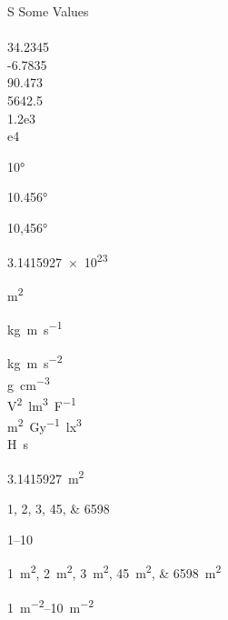 \documentclass[12pt,ngerman]{scrartcl}
\begin{document}
\begin{table}
\caption{Standardverhalten des  \texttt{S} Spaltentyps}
\centering
\begin{tabular}{S}
\toprule
{Some Values} \\
 \\
34.2345 \\
-6.7835 \\
90.473 \\
5642.5 \\
1.2e3 \\
e4 \\
\bottomrule
\end{tabular}
\end{table}

\ang{10}

\ang{10.456}

\ang{10,456}





\num{3.1415927e23}

\si{m^2}

\si{kg.m.s^{-1}}

\si{\kilo\gram\metre\per\square\second} \\
\si{\gram\per\cubic\centi\metre} \\
\si{\square\volt\cubic\lumen\per\farad} \\
\si{\metre\squared\per\gray\cubic\lux} \\
\si{\henry\second}

\SI{3.1415927}{m^2}

\numlist{1;2;3;45;6598}

\numrange{1}{10}

\SIlist{1;2;3;45;6598}{m^2}

\SIrange{1}{10}{m^{-2}}
\end{document}
